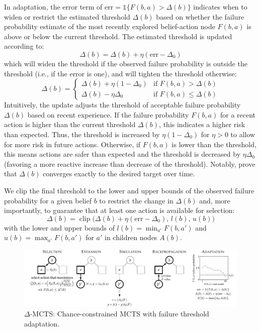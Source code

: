 In adaptation, the error term of $\text{err} = \mathds{1}\{F(b,a) > \Delta(b)\}$ indicates when to widen or restrict the estimated threshold $\Delta(b)$ based on whether the failure probability estimate of the most recently explored belief-action node $F(b,a)$ is above or below the current threshold.
The estimated threshold is updated according to:
\begin{equation}
    \Delta(b) = \Delta(b) + \eta(\text{err} - \Delta_0) \label{eq:aci_update}
\end{equation}
which will widen the threshold if the observed failure probability is outside the threshold (i.e., if the error is one), and will tighten the threshold otherwise:
\begin{equation}
    \Delta(b) = \begin{cases}
        \Delta(b) + \eta(1-\Delta_0) & \text{if } F(b,a) > \Delta(b)\\
        \Delta(b) - \eta\Delta_0 & \text{if } F(b,a) \leq \Delta(b)
    \end{cases} \label{eq:err}
\end{equation}
Intuitively, the update adjusts the threshold of acceptable failure probability $\Delta(b)$ based on recent experience.
If the failure probability $F(b,a)$ for a recent action is higher than the current threshold $\Delta(b)$, this indicates a higher risk than expected.
Thus, the threshold is increased by $\eta(1-\Delta_0)$ for $\eta > 0$ to allow for more risk in future actions.
Otherwise, if $F(b,a)$ is lower than the threshold, this means actions are safer than expected and the threshold is decreased by $\eta\Delta_0$ (favoring a more reactive increase than decrease of the threshold).
Notably, \textcite{gibbs2021adaptive} prove that $\Delta(b)$ converges exactly to the desired target over time.

We clip the final threshold to the lower and upper bounds of the observed failure probability for a given belief $b$ to restrict the change in $\Delta(b)$ and, more importantly, to guarantee that at least one action is available for selection:
\begin{equation}
    \Delta(b) = \operatorname{clip}\!\big( \Delta(b) + \eta(\text{err} - \Delta_0),\, l(b),\, u(b) \big)
\end{equation}
with the lower and upper bounds of $l(b) = \min_{a'} F(b, a')$ and $u(b) = \max_{a'} F(b, a')$ for $a'$ in children nodes $A(b)$.

\begin{figure}[t!]
    \centering
    \includegraphics[width=\textwidth]{diagrams/constrainedzero/delta-mcts.pdf}
    \caption{$\Delta$-MCTS: Chance-constrained MCTS with failure threshold adaptation.}
    \label{fig:delta-mcts}
\end{figure}


